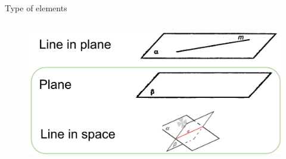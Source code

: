 \documentclass[aspectratio=169]{beamer}
\begin{document}
\begin{frame}[t]{Type of elements}
    \framesubtitle{}
    \vspace{-0.6cm}
    \begin{figure}[H]
        \centering\includegraphics[height=6cm,width=1\textwidth,keepaspectratio]{plane_line_in_space.png}
        \label{fig:plane_line_in_space.png}
    \end{figure}
\end{frame}
\end{document}
